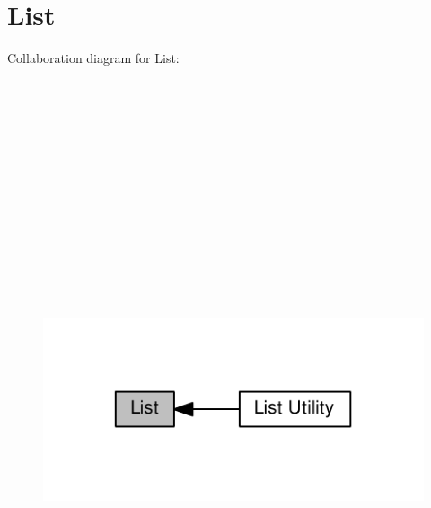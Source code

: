 \hypertarget{group__List}{}\section{List}
\label{group__List}
Collaboration diagram for List\+:\nopagebreak
\begin{figure}[H]
\begin{center}
\leavevmode
\includegraphics[height=550pt]{group__List}
\end{center}
\end{figure}
